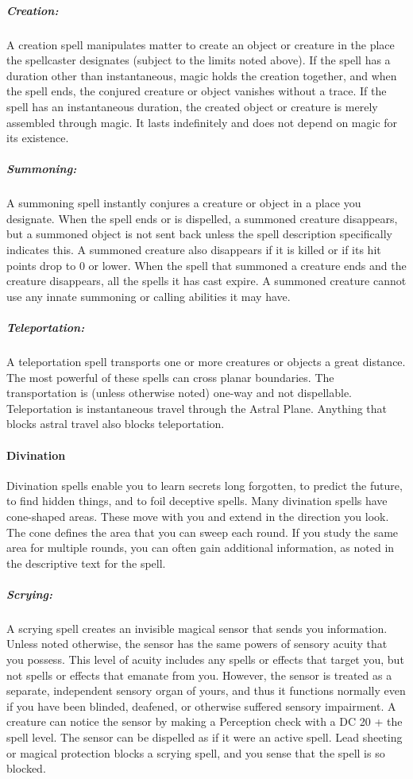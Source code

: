 \documentclass[../VancianToPsionics.tex]{subfiles}
\begin{document}
\subparagraph{Creation:}
A creation spell manipulates matter to create an object or creature in the place the spellcaster designates (subject to the limits noted above). 
If the spell has a duration other than instantaneous, magic holds the creation together, and when the spell ends, the conjured creature or object vanishes without a trace. 
If the spell has an instantaneous duration, the created object or creature is merely assembled through magic. 
It lasts indefinitely and does not depend on magic for its existence.

\subparagraph{Summoning:}
A summoning spell instantly conjures a creature or object in a place you designate. 
When the spell ends or is dispelled, a summoned creature disappears, but a summoned object is not sent back unless the spell description specifically indicates this. 
A summoned creature also disappears if it is killed or if its hit points drop to 0 or lower.
When the spell that summoned a creature ends and the creature disappears, all the spells it has cast expire. 
A summoned creature cannot use any innate summoning or calling abilities it may have.

\subparagraph{Teleportation:}
A teleportation spell transports one or more creatures or objects a great distance. 
The most powerful of these spells can cross planar boundaries. 
The transportation is (unless otherwise noted) one-way and not dispellable.
Teleportation is instantaneous travel through the Astral Plane. Anything that blocks astral travel also blocks teleportation.
\paragraph{Divination}
Divination spells enable you to learn secrets long forgotten, to predict the future, to find hidden things, and to foil deceptive spells.
Many divination spells have cone-shaped areas. These move with you and extend in the direction you look. 
The cone defines the area that you can sweep each round. 
If you study the same area for multiple rounds, you can often gain additional information, as noted in the descriptive text for the spell.

\subparagraph{Scrying:}

A scrying spell creates an invisible magical sensor that sends you information. 
Unless noted otherwise, the sensor has the same powers of sensory acuity that you possess. 
This level of acuity includes any spells or effects that target you, but not spells or effects that emanate from you. 
However, the sensor is treated as a separate, independent sensory organ of yours, and thus it functions normally even if you have been blinded, deafened, or otherwise suffered sensory impairment.
A creature can notice the sensor by making a Perception check with a DC 20 + the spell level.
The sensor can be dispelled as if it were an active spell.
Lead sheeting or magical protection blocks a scrying spell, and you sense that the spell is so blocked.
\end{document}
